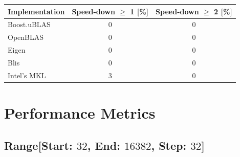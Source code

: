 \begin{table}[ht]
    \begin{tabular}{|l|c|c|}
        \hline
        \textbf{Implementation} & \textbf{Speed-down $\geq$ 1 [\%]} & \textbf{Speed-down $\geq$ 2 [\%]}\\
        \hline
        Boost.uBLAS & $0$ & $0$ \\
        \hline
        OpenBLAS    & $0$ & $0$ \\
        \hline
        Eigen       & $0$ & $0$ \\
        \hline
        Blis        & $0$ & $0$ \\
        \hline
        Intel's MKL & $3$ & $0$ \\
        \hline
    \end{tabular}
\end{table}

\clearpage
\section{Performance Metrics}

\subsection*{Range[Start: $32$, End: $16382$, Step: $32$]}

